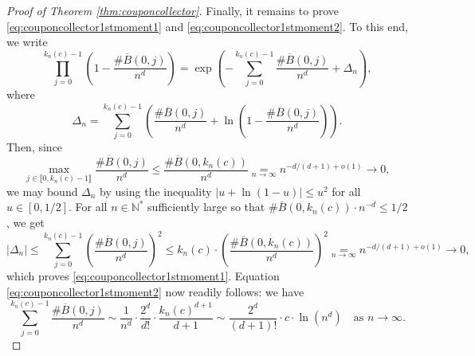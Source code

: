 \documentclass[a4paper,11pt]{article}
\begin{document}
\begin{proof}[Proof of Theorem \ref{thm:couponcollector}]
Finally, it remains to prove \eqref{eq:couponcollector1stmoment1} and \eqref{eq:couponcollector1stmoment2}.
To this end, we write
\[\prod_{j=0}^{k_n(c)-1}\left(1-\frac{\#\overline{B}(0,j)}{n^d}\right)=\exp\left(-\sum_{j=0}^{k_n(c)-1}\frac{\#\overline{B}(0,j)}{n^d}+\Delta_n\right),\]
where
\[\Delta_n=\sum_{j=0}^{k_n(c)-1}\left(\frac{\#\overline{B}(0,j)}{n^d}+\ln\left(1-\frac{\#\overline{B}(0,j)}{n^d}\right)\right).\]
Then, since
\[\max_{j\in\llbracket0,k_n(c)-1\rrbracket}\frac{\#\overline{B}(0,j)}{n^d}\leq\frac{\#\overline{B}(0,k_n(c))}{n^d}\underset{n\to\infty}{=}n^{-d/(d+1)+o(1)}\longrightarrow0,\]
we may bound $\Delta_n$ by using the inequality $|u+\ln(1-u)|\leq u^2$ for all $u\in[0,1/2]$.
For all $n\in\mathbb{N}^*$ sufficiently large so that $\#\overline{B}(0,k_n(c))\cdot n^{-d}\leq1/2$, we get
\[|\Delta_n|\leq\sum_{j=0}^{k_n(c)-1}\left(\frac{\#\overline{B}(0,j)}{n^d}\right)^2\leq k_n(c)\cdot\left(\frac{\#\overline{B}(0,k_n(c))}{n^d}\right)^2\underset{n\to\infty}{=}n^{-d/(d+1)+o(1)}\longrightarrow0,\]
which proves \eqref{eq:couponcollector1stmoment1}.
Equation \eqref{eq:couponcollector1stmoment2} now readily follows: we have
\[\sum_{j=0}^{k_n(c)-1}\frac{\#\overline{B}(0,j)}{n^d}\sim\frac{1}{n^d}\cdot\frac{2^d}{d!}\cdot\frac{k_n(c)^{d+1}}{d+1}\sim\frac{2^d}{(d+1)!}\cdot c\cdot\ln\left(n^d\right)\quad\text{as $n\to\infty$.}\]

\medskip


\end{proof}
\end{document}
